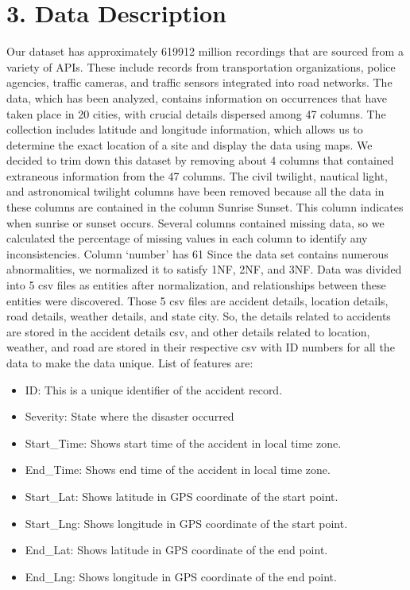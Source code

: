 \documentclass[10pt,twocolumn,letterpaper]{article}
\begin{document}
\section{3. Data Description}
Our dataset has approximately 619912 million recordings that are sourced from a variety of APIs. These include records from transportation organizations, police agencies, traffic cameras, and traffic sensors integrated into road networks. The data, which has been analyzed, contains information on occurrences that have taken place in 20 cities, with crucial details dispersed among 47 columns. The collection includes latitude and longitude information, which allows us to determine the exact location of a site and display the data using maps.
We decided to trim down this dataset by removing about 4 columns that contained extraneous information from the 47 columns. The civil twilight, nautical light, and astronomical twilight columns have been removed because all the data in these columns are contained in the column Sunrise Sunset. This column indicates when sunrise or sunset occurs. Several columns contained missing data, so we calculated the percentage of missing values in each column to identify any inconsistencies. Column ‘number’ has 61%
Since the data set contains numerous abnormalities, we normalized it to satisfy 1NF, 2NF, and 3NF. Data was divided into 5 csv files as entities after normalization, and relationships between these entities were discovered. Those 5 csv files are accident details, location details, road details, weather details, and state city. So, the details related to accidents are stored in the accident details csv, and other details related to location, weather, and road are stored in their respective csv with ID numbers for all the data to make the data unique.
 List of features are:  
\begin{itemize}
	\item   ID:  This is a unique identifier of the accident record.
	\item   Severity: State where the disaster occurred
	    \item   Start_Time: Shows start time of the accident in local time zone.
    \item   End_Time: Shows end time of the accident in local time zone.
    \item   Start_Lat: Shows latitude in GPS coordinate of the start point.
    \item  Start_Lng: Shows longitude in GPS coordinate of the start point.
    \item   End_Lat: Shows latitude in GPS coordinate of the end point.
    \item   End_Lng: Shows longitude in GPS coordinate of the end point.
\end{itemize}   
\end{document}
